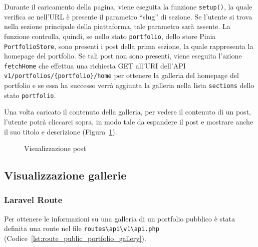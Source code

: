 Durante il caricamento della pagina, viene eseguita la funzione \verb|setup()|, la quale verifica se nell'URL \`e presente il parametro ``slug'' di sezione. Se l'utente si trova nella sezione principale della piattaforma, tale parametro sar\`a assente. La funzione controlla, quindi, se nello stato \verb|portfolio|, dello store Pinia \verb|PortfolioStore|, sono presenti i post della prima sezione, la quale rappresenta la homepage del portfolio. Se tali post non sono presenti, viene eseguita l'azione \verb|fetchHome| che effettua una richiesta GET all'URI dell'API \verb|v1/portfolios/{portfolio}/home| per ottenere la
galleria del homepage del portfolio e se essa ha successo verr\`a aggiunta la galleria nella lista \verb|sections| dello stato \verb|portfolio|.

Una volta caricato il contenuto della galleria, per vedere il contenuto di un post, l'utente potr\`a cliccarci sopra, in modo tale da espandere il post e mostrare anche il suo titolo e descrizione (Figura~\ref{fig:p-h-view-p}).

\begin{figure}[htbp]
	\centering
	\fboxsep=0.5pt
	\fboxrule=0.5pt
	\caption{Visualizzazione post}
	\label{fig:p-h-view-p}
\end{figure}

\subsection{Visualizzazione gallerie}
\subsubsection{Laravel Route}
Per ottenere le informazioni su una galleria di un portfolio pubblico \`e stata definita una route nel file \verb|routes\api\v1\api.php| (Codice~\ref{lst:route_public_portfolio_gallery}).

